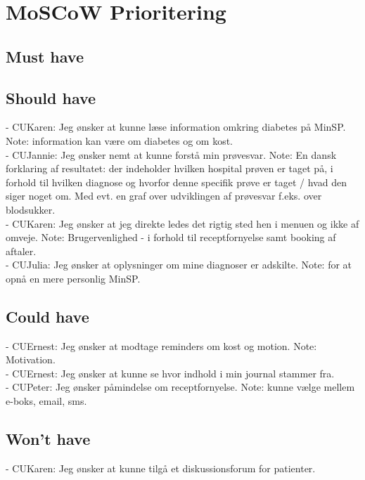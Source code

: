 \section{MoSCoW Prioritering}
\subsection*{Must have}
\subsection*{Should have}
%
- CUKaren: Jeg ønsker at kunne læse information omkring diabetes på MinSP. Note: information kan være om diabetes og om kost.\\ %
- CUJannie: Jeg ønsker nemt at kunne forstå min prøvesvar. Note: En dansk forklaring af resultatet: der indeholder hvilken hospital prøven er taget på, i forhold til hvilken diagnose og hvorfor denne specifik prøve er taget / hvad den siger noget om. Med evt. en graf over udviklingen af prøvesvar f.eks. over blodsukker.\\
- CUKaren: Jeg ønsker at jeg direkte ledes det rigtig sted hen i menuen og ikke af omveje. Note: Brugervenlighed - i forhold til receptfornyelse samt booking af aftaler.\\ 
- CUJulia: Jeg ønsker at oplysninger om mine diagnoser er adskilte. Note: for at opnå en mere personlig MinSP.\\
\subsection*{Could have}
- CUErnest: Jeg ønsker at modtage reminders om kost og motion. Note: Motivation. \\
- CUErnest: Jeg ønsker at kunne se hvor indhold i min journal stammer fra.\\
- CUPeter: Jeg ønsker påmindelse om receptfornyelse. Note: kunne vælge mellem e-boks, email, sms.\\
\subsection*{Won't have}
- CUKaren: Jeg ønsker at kunne tilgå et diskussionsforum for patienter.\\ %